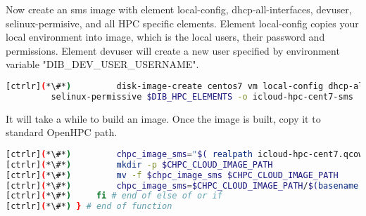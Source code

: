 	Now create an sms image with element local-config, dhcp-all-interfaces, devuser, selinux-permisive, and all HPC specific elements. Element local-config copies your local environment into image, which is the local users, their password and permissions. Element devuser will create a new user specified by environment variable "DIB\_DEV\_USER\_USERNAME". 


\begin{lstlisting}[language=bash,keywords={}]
[ctrlr](*\#*)         disk-image-create centos7 vm local-config dhcp-all-interfaces devuser \
         selinux-permissive $DIB_HPC_ELEMENTS -o icloud-hpc-cent7-sms
\end{lstlisting} 

	It will take a while to build an image. Once the image is built, copy it to standard OpenHPC path.


\begin{lstlisting}[language=bash,keywords={}]
[ctrlr](*\#*)         chpc_image_sms="$( realpath icloud-hpc-cent7.qcow2)"
[ctrlr](*\#*)         mkdir -p $CHPC_CLOUD_IMAGE_PATH
[ctrlr](*\#*)         mv -f $chpc_image_sms $CHPC_CLOUD_IMAGE_PATH
[ctrlr](*\#*)         chpc_image_sms=$CHPC_CLOUD_IMAGE_PATH/$(basename $chpc_image_sms)
[ctrlr](*\#*)     fi # end of else of or if
[ctrlr](*\#*) } # end of function
\end{lstlisting} 
